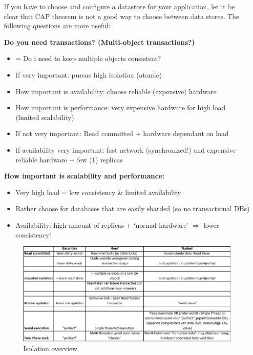\documentclass{article}
\begin{document}
If you have to choose and configure a datastore for your application, let it be clear that CAP theorem is not a good way to choose between data stores. 
The following questions are more useful:

\textbf{Do you need transactions? (Multi-object transactions?)}

\begin{itemize}
    \item = Do i need to keep multiple objects consistent?
    \item If very important: pursue high isolation (atomic)
    \item How important is availability: choose reliable (expensive) hardware
    \item How important is performance: very expensive hardware for high load (limited scalability)
    \item If not very important: Read committed + hardware dependant on load
    \item If availability very important: fast network (synchronized!) and expensive reliable hardware + few (1) replicas
\end{itemize}

\textbf{How important is scalability and performance:}

\begin{itemize}
    \item Very high load = low consistency \& limited availability
    \item Rather choose for databases that are easily sharded (so no transactional DBs)
    \item Availability: high amount of replicas + `normal hardware' $\Rightarrow$ lower consistency!
\end{itemize}

\begin{figure}[H]
    \centering
    \includegraphics[width=\textwidth]{overview-isolation.png}
    \caption{Isolation overview}
\end{figure}
\end{document}
